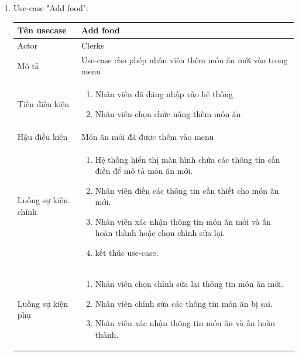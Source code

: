 \begin{enumerate}
    \newpage
    \item Use-case "Add food":
    \begin{center}{\color{black}}
        \begin{tabular}{|p{5cm}|p{7cm}|} \hline
            Tên usecase &   Add food\\ \hline
            Actor& Clerks \\ \hline
            Mô tả& Use-case cho phép nhân viên thêm món ăn mới vào trong menu \\ \hline
            Tiền điều kiện &
            \begin{enumerate}[1.]
                \item Nhân viên đã đăng nhập vào hệ thống
                \item Nhân viên chọn chức năng thêm món ăn
            \end{enumerate}\\ \hline
            Hậu điều kiện & Món ăn mới đã được thêm vào menu\\ \hline
            Luồng sự kiện chính &  
                \begin{enumerate}[1.]
                    \item Hệ thống hiển thị màn hình chứa các thông tin cần điền để mô tả món ăn mới.
                    \item Nhân viên điền các thông tin cần thiết cho món ăn mới.
                    \item Nhân viên xác nhận thông tin món ăn mới và ấn hoàn thành hoặc chọn chỉnh sửa lại.
    				\item kết thúc use-case.
                \end{enumerate} \\\hline
            Luồng sự kiện phụ &
            \begin{enumerate}[1.]
                \item Nhân viên chọn chỉnh sửa lại thông tin món ăn mới.
                \item Nhân viên chỉnh sửa các thông tin món ăn bị sai.
                \item Nhân viên xác nhận thông tin món ăn và ấn hoàn thành.
            \end{enumerate}\\ \hline
        \end{tabular}
    \end{center}
    

\end{enumerate}

